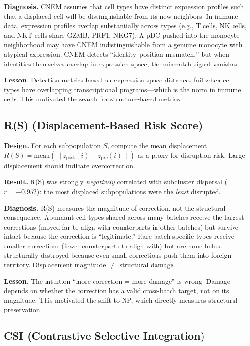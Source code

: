 \documentclass[10pt]{article}
\begin{document}
\textbf{Diagnosis.} CNEM assumes that cell types have distinct expression profiles such that a displaced cell will be distinguishable from its new neighbors. In immune data, expression profiles overlap substantially across types (e.g., T cells, NK cells, and NKT cells share GZMB, PRF1, NKG7). A pDC pushed into the monocyte neighborhood may have CNEM indistinguishable from a genuine monocyte with atypical expression. CNEM detects ``identity--position mismatch,'' but when identities themselves overlap in expression space, the mismatch signal vanishes.

\textbf{Lesson.} Detection metrics based on expression-space distances fail when cell types have overlapping transcriptional programs---which is the norm in immune cells. This motivated the search for structure-based metrics.

\subsection{R(S) (Displacement-Based Risk Score)}

\textbf{Design.} For each subpopulation $S$, compute the mean displacement $R(S) = \text{mean}(\|z_{\text{post}}(i) - z_{\text{pre}}(i)\|)$ as a proxy for disruption risk. Large displacement should indicate overcorrection.

\textbf{Result.} R(S) was strongly \textit{negatively} correlated with subcluster dispersal ($r = -0.952$): the most displaced subpopulations were the \textit{least} disrupted.

\textbf{Diagnosis.} R(S) measures the magnitude of correction, not the structural consequence. Abundant cell types shared across many batches receive the largest corrections (moved far to align with counterparts in other batches) but survive intact because the correction is ``legitimate.'' Rare batch-specific types receive smaller corrections (fewer counterparts to align with) but are nonetheless structurally destroyed because even small corrections push them into foreign territory. Displacement magnitude $\neq$ structural damage.

\textbf{Lesson.} The intuition ``more correction = more damage'' is wrong. Damage depends on whether the correction has a valid cross-batch target, not on its magnitude. This motivated the shift to NP, which directly measures structural preservation.

\subsection{CSI (Contrastive Selective Integration)}
\end{document}
